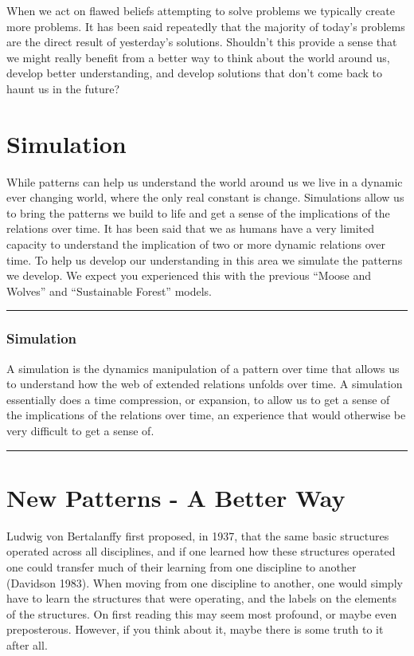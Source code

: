 \documentclass[]{memoir}
\begin{document}
When we act on flawed beliefs attempting to solve problems we typically
create more problems. It has been said repeatedly that the majority of
today's problems are the direct result of yesterday's solutions.
Shouldn't this provide a sense that we might really benefit from a
better way to think about the world around us, develop better
understanding, and develop solutions that don't come back to haunt us in
the future?

\section{Simulation}

While patterns can help us understand the world around us we live in a
dynamic ever changing world, where the only real constant is change.
Simulations allow us to bring the patterns we build to life and get a
sense of the implications of the relations over time. It has been said
that we as humans have a very limited capacity to understand the
implication of two or more dynamic relations over time. To help us
develop our understanding in this area we simulate the patterns we
develop. We expect you experienced this with the previous ``Moose and
Wolves'' and ``Sustainable Forest'' models.

\begin{center}\rule{3in}{0.4pt}\end{center}

\subsubsection{Simulation}

A simulation is the dynamics manipulation of a pattern over time that
allows us to understand how the web of extended relations unfolds over
time. A simulation essentially does a time compression, or expansion, to
allow us to get a sense of the implications of the relations over time,
an experience that would otherwise be very difficult to get a sense of.

\begin{center}\rule{3in}{0.4pt}\end{center}

\section{New Patterns - A Better Way}

Ludwig von Bertalanffy first proposed, in 1937, that the same basic
structures operated across all disciplines, and if one learned how these
structures operated one could transfer much of their learning from one
discipline to another (Davidson 1983). When moving from one discipline
to another, one would simply have to learn the structures that were
operating, and the labels on the elements of the structures. On first
reading this may seem most profound, or maybe even preposterous.
However, if you think about it, maybe there is some truth to it after
all.
\end{document}
